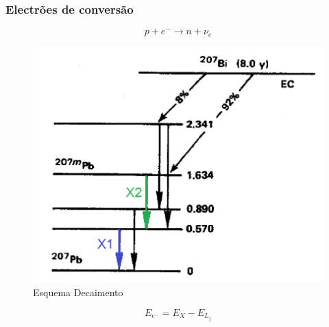 \documentclass[10pt]{beamer}
\begin{document}
\begin{frame}
\frametitle{Electrões de conversão}

\begin{equation}
 p + e^{-} \rightarrow n + \nu_{e}
\end{equation}

\begin{figure}
  \centering
  \includegraphics[scale=0.4]{bi.png}
\caption{Esquema Decaimento }
\label{fig:test}
\end{figure}


\begin{equation}
E_{e^-}=E_{X} -E_{L_{j}}
\label{Ee}
\end{equation}


\end{frame}
\end{document}
